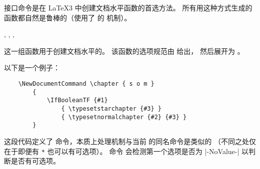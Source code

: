 \documentclass{l3doc}
\begin{document}
%

接口命令是在 \LaTeX3 中创建文档水平函数的首选方法。
所有用这种方式生成的函数都自然是鲁棒的（使用了 \eTeX{} 的  机制）。

%
\begin{function}
    {
             \NewDocumentCommand     ,
             \RenewDocumentCommand   ,
             \ProvideDocumentCommand ,
             \DeclareDocumentCommand
    }
    \begin{syntax}
           
    \end{syntax}
    这一组函数用于创建文档水平的。
    该函数的选项规范由  给出，
    然后展开为 。
\end{function}

%
以下是一个例子：
\begin{verbatim}
    \NewDocumentCommand \chapter { s o m }
        {
            \IfBooleanTF {#1}
                { \typesetstarchapter {#3} }
                { \typesetnormalchapter {#2} {#3} }
        }
\end{verbatim}
这段代码定义了  命令，本质上处理机制与当前 \LaTeXe{} 的同名命令是类似的
（不同之处仅在于即便有 \texttt{*} 也可以有可选项）。
命令   会检测第一个选项是否为 |-NoValue-| 以判断是否有可选项。
\end{document}
